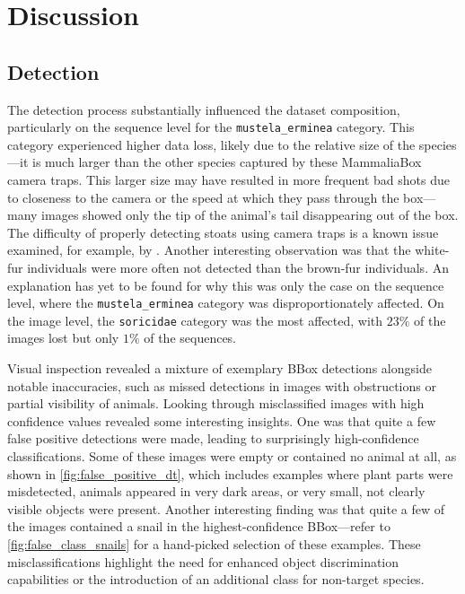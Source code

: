 


\section{Discussion}
\label{discussion}

\subsection{Detection}
The detection process substantially influenced the dataset composition, particularly on the sequence level for the \texttt{mustela\_erminea} category.
This category experienced higher data loss, likely due to the relative size of the species---it is much larger than the other species captured by these MammaliaBox camera traps.
This larger size may have resulted in more frequent bad shots due to closeness to the camera or the speed at which they pass through the box---many images showed only the tip of the animal's tail disappearing out of the box.
The difficulty of properly detecting stoats using camera traps is a known issue examined, for example, by \textcite{crooseAssessingDetectabilityIrish2022}.
Another interesting observation was that the white-fur individuals were more often not detected than the brown-fur individuals.
An explanation has yet to be found for why this was only the case on the sequence level, where the \texttt{mustela\_erminea} category was disproportionately affected.
On the image level, the \texttt{soricidae} category was the most affected, with \(23\%\) of the images lost but only \(1\%\) of the sequences.

Visual inspection revealed a mixture of exemplary BBox detections alongside notable inaccuracies, such as missed detections in images with obstructions or partial visibility of animals.
Looking through misclassified images with high confidence values revealed some interesting insights.
One was that quite a few false positive detections were made, leading to surprisingly high-confidence classifications.
Some of these images were empty or contained no animal at all, as shown in \autoref{fig:false_positive_dt}, which includes examples where plant parts were misdetected, animals appeared in very dark areas, or very small, not clearly visible objects were present.
Another interesting finding was that quite a few of the images contained a snail in the highest-confidence BBox---refer to \autoref{fig:false_class_snails} for a hand-picked selection of these examples.
These misclassifications highlight the need for enhanced object discrimination capabilities or the introduction of an additional class for non-target species.

